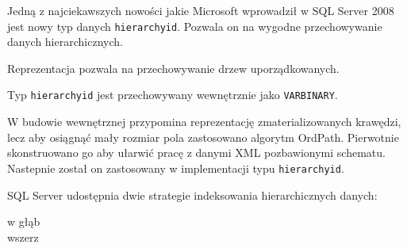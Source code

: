 
Jedną z najciekawszych nowości jakie Microsoft wprowadził w SQL Server 2008 jest nowy typ danych \texttt{hierarchyid}.
Pozwala on na wygodne przechowywanie danych hierarchicznych.





Reprezentacja pozwala na przechowywanie drzew uporządkowanych.



Typ \texttt{hierarchyid} jest przechowywany wewnętrznie jako \texttt{VARBINARY}.

W budowie wewnętrznej przypomina reprezentację zmaterializowanych krawędzi, 
lecz aby osiągnąć mały rozmiar pola zastosowano algorytm OrdPath\cite{ordpath,kumaran}.
Pierwotnie  skonstruowano go aby ułarwić pracę z danymi XML pozbawionymi schematu.
Nastepnie został on zastosowany w implementacji typu \texttt{hierarchyid}.






SQL Server udostępnia dwie strategie indeksowania hierarchicznych danych:
\begin{description}
 \item[w głąb]  
 \item[wszerz]  
 \end{description}



